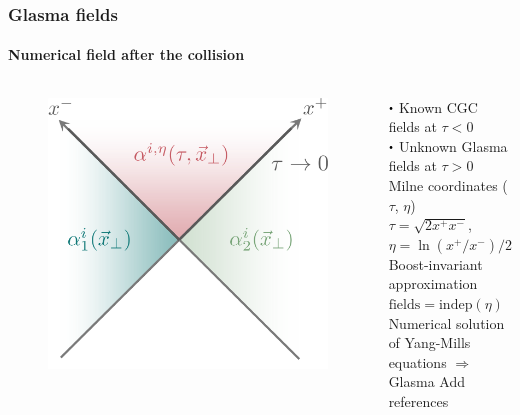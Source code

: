 \documentclass[aspectratio=169,11pt,usenames,dvipsnames]{beamer}
\newcommand\sbullet[1][.5]{\mathbin{\vcenter{\hbox{\scalebox{#1}{$\bullet$}}}}}
\begin{document}
\begin{frame}[noframenumbering]
    \frametitle{Glasma fields}
    \framesubtitle{Numerical field after the collision}
    \begin{columns}[onlytextwidth,t]
       \begin{figure}
            \centering
            \includegraphics[width=0.85\columnwidth]{images/cgc_col.png}
            \captionsetup{justification=centering}
        \end{figure}
        \vspace{0.2cm}
        \begin{center}
            {\color{customgreen}$\sbullet[0.6]$ Known CGC fields} at $\tau<0$ \\[0.1cm]
            {\color{custompink}$\sbullet[0.6]$ Unknown Glasma fields} at $\tau>0$ \\[0.5cm]
            {\scriptsize{\color{lightgray}Milne coordinates ($\tau$, $\eta$)} \\
            {\color{lightgray}$\tau=\sqrt{2 x^+x^-}$, $\eta=\ln(x^+/x^-)/2$}\\[0.4cm]
            {\color{lightgray}Boost-invariant approximation $\mathrm{fields}=\mathrm{indep}(\eta)$} \\[0.3cm]
            {\color{lightgray}Numerical solution of Yang-Mills}\\[-0.15cm] {\color{lightgray}equations $\Rightarrow$ Glasma}}
            {\footnotesize\color{red}Add references}
        \end{center}
    \end{columns}
\end{frame}
\end{document}
